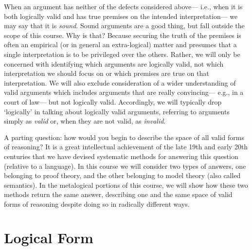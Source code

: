 When an argument has neither of the defects considered above--- i.e., when it is both logically valid and has true premises on the intended interpretation--- we may say that it is \textit{sound}. %
Sound arguments are a good thing, but fall outside the scope of this course.
Why is that?
Because securing the truth of the premises is often an empirical (or in general an extra-logical) matter and presumes that a single interpretation is to be privileged over the others.
Rather, we will only be concerned with identifying which arguments are logically valid, not which interpretation we should focus on or which premises are true on that interpretation.
We will also exclude consideration of a wider understanding of valid arguments which includes arguments that are really convincing--- e.g., in a court of law--- but not logically valid.
Accordingly, we will typically drop `logically' in talking about logically valid arguments, referring to arguments simply as \textit{valid} or, when they are not valid, as \textit{invalid}.

A parting question: how would you begin to describe the space of all valid forms of reasoning? 
It is a great intellectual achievement of the late 19th and early 20th centuries that we have devised systematic methods for answering this question (relative to a language).
In this course we will consider two types of answers, one belonging to proof theory, and the other belonging to model theory (also called semantics).
In the metalogical portions of this course, we will show how these two methods return the same answer, describing one and the same space of valid forms of reasoning despite doing so in radically different ways.





\section{Logical Form}
\label{sec:LogicalForm}

